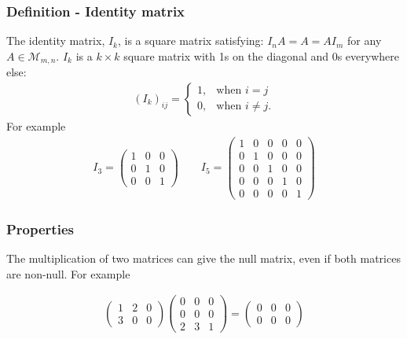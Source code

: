 \documentclass[usenames,dvipsnames,aspectratio=169,10pt]{beamer}
\numberwithin{equation}{section}
\begin{document}
\begin{frame}
\frametitle{Definition - Identity matrix}
The identity matrix, $I_k$, is a square matrix satisfying: $I_n A = A = A I_m$ for any $A\in\mathcal{M}_{m,n}$. $I_k$ is a $k\times k$ square matrix with 1s on the diagonal and 0s everywhere else:
\begin{align*}
(I_k)_{ij} = 
\begin{cases}
1, & \text{when } i=j\\
0, & \text{when } i\neq j.
\end{cases}
\end{align*}
For example
\begin{align*}
I_3 =
\begin{pmatrix}
1 & 0 & 0 \\
0 & 1 & 0 \\
0 & 0 & 1
\end{pmatrix}
\quad \quad
I_5 =
\begin{pmatrix}
1 & 0 & 0 & 0 & 0 \\
0 & 1 & 0 & 0 & 0 \\
0 & 0 & 1 & 0 & 0 \\
0 & 0 & 0 & 1 & 0 \\
0 & 0 & 0 & 0 & 1
\end{pmatrix}
\end{align*}
\end{frame}





\begin{frame}
\frametitle{Properties}
The multiplication of two matrices can give the null matrix, even if both matrices are non-null. For example

\begin{align*}
\begin{pmatrix}
1 & 2 & 0 \\
3 & 0 & 0
\end{pmatrix}
\begin{pmatrix}
0 & 0 & 0 \\
0 & 0 & 0 \\
2 & 3 & 1
\end{pmatrix}
=
\begin{pmatrix}
0 & 0 & 0 \\
0 & 0 & 0
\end{pmatrix}
\end{align*}
\end{frame}
\end{document}
